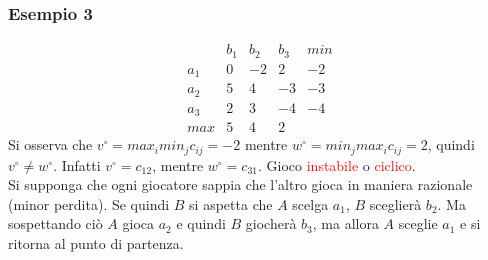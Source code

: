 \documentclass[12pt,a4paper]{article}
\begin{document}
\subsubsection{Esempio 3}
$$\begin{array}{c|ccc|c}
& b_1 & b_2 & b_3 & min\\ \hline
a_1 & 0 & -2 & 2 & -2\\
a_2 & 5 & 4 & -3 & -3\\ 
a_3 & 2 & 3 & -4 & -4\\\hline
max & 5 & 4 & 2 & 
\end{array}$$
Si osserva che $v^\circ = max_imin_jc_{ij}=-2$ mentre $w^\circ=min_jmax_ic_{ij} = 2$, quindi $v^\circ \not = w^\circ$. Infatti $v^\circ = c_{12}$, mentre $w^\circ=c_{31}$. Gioco \textcolor{red}{instabile} o \textcolor{red}{ciclico}.\\
Si supponga che ogni giocatore sappia che l’altro gioca in maniera razionale (minor perdita). Se quindi $B$ si aspetta che $A$ scelga $a_1$, $B$ sceglierà $b_2$. Ma sospettando ciò $A$ gioca $a_2$ e quindi $B$ giocherà $b_3$, ma allora $A$ sceglie $a_1$ e si ritorna al punto di partenza.
\end{document}
